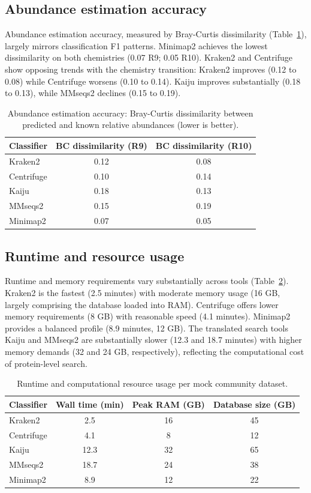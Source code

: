 \documentclass[11pt]{article}
\begin{document}
\subsection{Abundance estimation accuracy}

Abundance estimation accuracy, measured by Bray-Curtis dissimilarity (Table~\ref{tab:abundance}), largely mirrors classification F1 patterns. Minimap2 achieves the lowest dissimilarity on both chemistries (0.07 R9; 0.05 R10). Kraken2 and Centrifuge show opposing trends with the chemistry transition: Kraken2 improves (0.12 to 0.08) while Centrifuge worsens (0.10 to 0.14). Kaiju improves substantially (0.18 to 0.13), while MMseqs2 declines (0.15 to 0.19).

\begin{table}[htbp]
\centering
\caption{Abundance estimation accuracy: Bray-Curtis dissimilarity between predicted and known relative abundances (lower is better).}
\label{tab:abundance}
\begin{tabular}{@{}lcc@{}}
\toprule
Classifier & BC dissimilarity (R9) & BC dissimilarity (R10) \\
\midrule
Kraken2    & 0.12 & 0.08 \\
Centrifuge & 0.10 & 0.14 \\
Kaiju      & 0.18 & 0.13 \\
MMseqs2    & 0.15 & 0.19 \\
Minimap2   & 0.07 & 0.05 \\
\bottomrule
\end{tabular}
\end{table}

\subsection{Runtime and resource usage}

Runtime and memory requirements vary substantially across tools (Table~\ref{tab:runtime}). Kraken2 is the fastest (2.5 minutes) with moderate memory usage (16 GB, largely comprising the database loaded into RAM). Centrifuge offers lower memory requirements (8 GB) with reasonable speed (4.1 minutes). Minimap2 provides a balanced profile (8.9 minutes, 12 GB). The translated search tools Kaiju and MMseqs2 are substantially slower (12.3 and 18.7 minutes) with higher memory demands (32 and 24 GB, respectively), reflecting the computational cost of protein-level search.

\begin{table}[htbp]
\centering
\caption{Runtime and computational resource usage per mock community dataset.}
\label{tab:runtime}
\begin{tabular}{@{}lccc@{}}
\toprule
Classifier & Wall time (min) & Peak RAM (GB) & Database size (GB) \\
\midrule
Kraken2    & 2.5  & 16 & 45 \\
Centrifuge & 4.1  & 8  & 12 \\
Kaiju      & 12.3 & 32 & 65 \\
MMseqs2    & 18.7 & 24 & 38 \\
Minimap2   & 8.9  & 12 & 22 \\
\bottomrule
\end{tabular}
\end{table}
\end{document}
